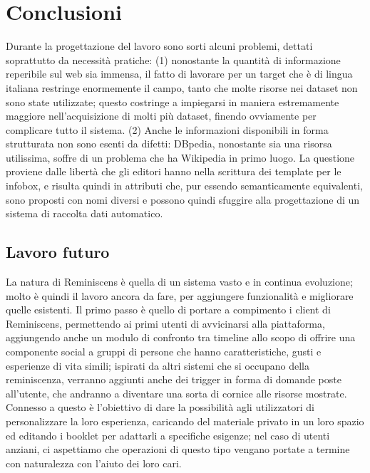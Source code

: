 \documentclass[sigproc-sp.tex]{subfiles}
\begin{document}
\section{Conclusioni}
Durante la progettazione del lavoro sono sorti alcuni problemi, dettati soprattutto da necessità pratiche: (1) nonostante la quantità di informazione reperibile sul web sia immensa, il fatto di lavorare per un target che è di lingua italiana restringe enormemente il campo, tanto che molte risorse nei dataset non sono state utilizzate; questo costringe a impiegarsi in maniera estremamente maggiore nell’acquisizione di molti più dataset, finendo ovviamente per complicare tutto il sistema. (2) Anche le informazioni disponibili in forma strutturata non sono esenti da difetti: DBpedia, nonostante sia una risorsa utilissima, soffre di un problema che ha Wikipedia in primo luogo. La questione proviene dalle libertà che gli editori hanno nella scrittura dei template per le infobox, e risulta quindi in attributi che, pur essendo semanticamente equivalenti, sono proposti con nomi diversi e possono quindi sfuggire alla progettazione di un sistema di raccolta dati automatico.

\subsection{Lavoro futuro}
La natura di Reminiscens è quella di un sistema vasto e in continua evoluzione; molto è quindi il lavoro ancora da fare, per aggiungere funzionalità e migliorare quelle esistenti. Il primo passo è quello di portare a compimento i client di Reminiscens, permettendo ai primi utenti di avvicinarsi alla piattaforma, aggiungendo anche un modulo di confronto tra timeline allo scopo di offrire una componente social a gruppi di persone che hanno caratteristiche, gusti e esperienze di vita simili; ispirati da altri sistemi che si occupano della reminiscenza, verranno aggiunti anche dei trigger in forma di domande poste all’utente, che andranno a diventare una sorta di cornice alle risorse mostrate. Connesso a questo è l’obiettivo di dare la possibilità agli utilizzatori di personalizzare la loro esperienza, caricando del materiale privato in un loro spazio ed editando i booklet per adattarli a specifiche esigenze; nel caso di utenti anziani, ci aspettiamo che operazioni di questo tipo vengano portate a termine con naturalezza con l’aiuto dei loro cari. 
\end{document}
